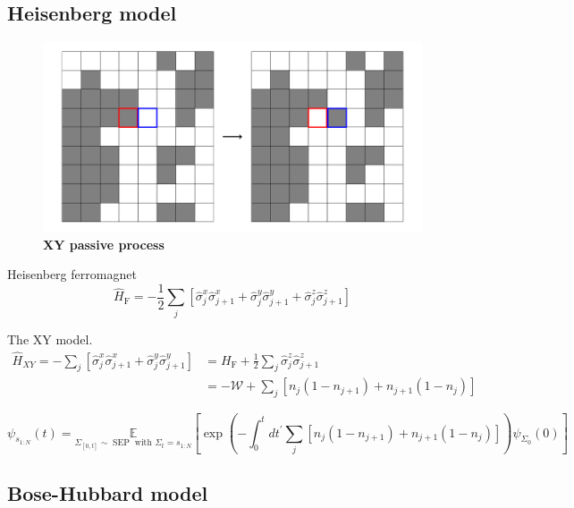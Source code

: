 \subsection{Heisenberg model}
\label{sec:res-hm}
\begin{figure}[h]
	\centering
	\includegraphics[width=\linewidth]{Chapter6/Figs/Vector/xy_passive}
	\caption[XY passive process]{\textbf{XY passive process}}
	\label{fig:xypassive}
\end{figure}

Heisenberg ferromagnet
\begin{equation}
	\hat H_{\mathrm{F}}=-\frac{1}{2} \sum_{j}\left[\hat{\sigma}_{j}^{x} \hat{\sigma}_{j+1}^{x}+\hat{\sigma}_{j}^{y} \hat{\sigma}_{j+1}^{y}+\hat{\sigma}_{j}^{z} \hat{\sigma}_{j+1}^{z}\right]
\end{equation}

The XY model.
\begin{equation}
	\begin{aligned} 
		\hat H_{X Y}=-\sum_{j}\left[\hat{\sigma}_{j}^{x} \hat{\sigma}_{j+1}^{x}+\hat{\sigma}_{j}^{y} \hat{\sigma}_{j+1}^{y}\right] &=H_{\mathrm{F}}+\frac{1}{2} \sum_{j} \hat{\sigma}_{j}^{z} \hat{\sigma}_{j+1}^{z} \\ 						&=-\mathcal{W}+\sum_{j}\left[n_{j}\left(1-n_{j+1}\right)+n_{j+1}\left(1-n_{j}\right)\right] 
	\end{aligned}
\end{equation}

\begin{equation}
	\psi_{s_{1: N}}(t)=\underset{\Sigma_{[0, t]} \sim \operatorname{SEP} \text{ with } \Sigma_{t}=s_{1: N}}{\mathbb{E}}
	\left[\exp \left(-\int_{0}^{t} d t^{\prime} \sum_{j}\left[n_{j}\left(1-n_{j+1}\right)+n_{j+1}\left(1-n_{j}\right)\right]\right) \psi_{\Sigma_{0}}(0)\right]
\end{equation}

\subsection{Bose-Hubbard model}
\label{sec:res-bhm}




